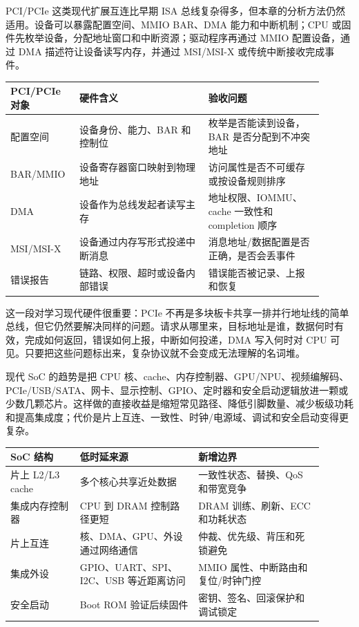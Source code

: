 PCI/PCIe 这类现代扩展互连比早期 ISA 总线复杂得多，但本章的分析方法仍然适用。设备可以暴露配置空间、MMIO BAR、DMA 能力和中断机制；CPU 或固件先枚举设备，分配地址窗口和中断资源；驱动程序再通过 MMIO 配置设备，通过 DMA 描述符让设备读写内存，并通过 MSI/MSI-X 或传统中断接收完成事件。

\begin{longtable}{L{0.18\linewidth}L{0.38\linewidth}L{0.34\linewidth}}
\toprule
PCI/PCIe 对象 & 硬件含义 & 验收问题 \\
\midrule
配置空间 & 设备身份、能力、BAR 和控制位 & 枚举是否能读到设备，BAR 是否分配到不冲突地址 \\
BAR/MMIO & 设备寄存器窗口映射到物理地址 & 访问属性是否不可缓存或按设备规则排序 \\
DMA & 设备作为总线发起者读写主存 & 地址权限、IOMMU、cache 一致性和 completion 顺序 \\
MSI/MSI-X & 设备通过内存写形式投递中断消息 & 消息地址/数据配置是否正确，是否会丢事件 \\
错误报告 & 链路、权限、超时或设备内部错误 & 错误能否被记录、上报和恢复 \\
\bottomrule
\end{longtable}

这一段对学习现代硬件很重要：PCIe 不再是多块板卡共享一排并行地址线的简单总线，但它仍然要解决同样的问题。请求从哪里来，目标地址是谁，数据何时有效，完成如何返回，错误如何上报，中断如何投递，DMA 写入何时对 CPU 可见。只要把这些问题标出来，复杂协议就不会变成无法理解的名词堆。

现代 SoC 的趋势是把 CPU 核、cache、内存控制器、GPU/NPU、视频编解码、PCIe/USB/SATA、网卡、显示控制、GPIO、定时器和安全启动逻辑放进一颗或少数几颗芯片。这样做的直接收益是缩短常见路径、降低引脚数量、减少板级功耗和提高集成度；代价是片上互连、一致性、时钟/电源域、调试和安全启动变得更复杂。

\begin{longtable}{L{0.2\linewidth}L{0.34\linewidth}L{0.36\linewidth}}
\toprule
SoC 结构 & 低时延来源 & 新增边界 \\
\midrule
片上 L2/L3 cache & 多个核心共享近处数据 & 一致性状态、替换、QoS 和带宽竞争 \\
集成内存控制器 & CPU 到 DRAM 控制路径更短 & DRAM 训练、刷新、ECC 和功耗状态 \\
片上互连 & 核、DMA、GPU、外设通过网络通信 & 仲裁、优先级、背压和死锁避免 \\
集成外设 & GPIO、UART、SPI、I2C、USB 等近距离访问 & MMIO 属性、中断路由和复位/时钟门控 \\
安全启动 & Boot ROM 验证后续固件 & 密钥、签名、回滚保护和调试锁定 \\
\bottomrule
\end{longtable}

